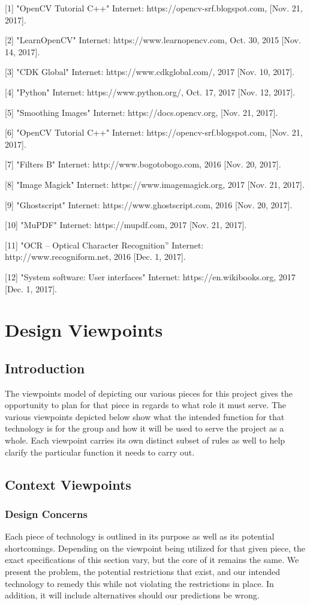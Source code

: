 \documentclass[onecolumn, draftclsnofoot,10pt, compsoc]{IEEEtran}
\begin{document}
[1] "OpenCV Tutorial C++" Internet: https://opencv-srf.blogspot.com, [Nov. 21, 2017].

[2] "LearnOpenCV" Internet: https://www.learnopencv.com, Oct. 30, 2015 [Nov. 14, 2017].

[3] "CDK Global" Internet: https://www.cdkglobal.com/, 2017 [Nov. 10, 2017].

[4] "Python" Internet: https://www.python.org/, Oct. 17, 2017 [Nov. 12, 2017].

[5] "Smoothing Images" Internet: https://docs.opencv.org, [Nov. 21, 2017].

[6] "OpenCV Tutorial C++" Internet: https://opencv-srf.blogspot.com, [Nov. 21, 2017].

[7] "Filters B" Internet: http://www.bogotobogo.com, 2016 [Nov. 20, 2017].

[8] "Image Magick" Internet: https://www.imagemagick.org, 2017 [Nov. 21, 2017].

[9] "Ghostscript" Internet: https://www.ghostscript.com, 2016 [Nov. 20, 2017].

[10] "MuPDF" Internet: https://mupdf.com, 2017 [Nov. 21, 2017].

[11] "OCR – Optical Character Recognition” Internet: http://www.recogniform.net, 2016 [Dec. 1, 2017].

[12] "System software: User interfaces" Internet: https://en.wikibooks.org, 2017 [Dec. 1, 2017].

\section{Design Viewpoints}
\subsection{Introduction}
The viewpoints model of depicting our various pieces for this project gives the opportunity to plan for that piece in regards to what role it must serve. The various viewpoints depicted below show what the intended function for that technology is for the group and how it will be used to serve the project as a whole. Each viewpoint carries its own distinct subset of rules as well to help clarify the particular function it needs to carry out. 

\subsection{Context Viewpoints}
\subsubsection{Design Concerns}
Each piece of technology is outlined in its purpose as well as its potential shortcomings. Depending on the viewpoint being utilized for that given piece, the exact specifications of this section vary, but the core of it remains the same. We present the problem, the potential restrictions that exist, and our intended technology to remedy this while not violating the restrictions in place. In addition, it will include alternatives should our predictions be wrong.
\end{document}
